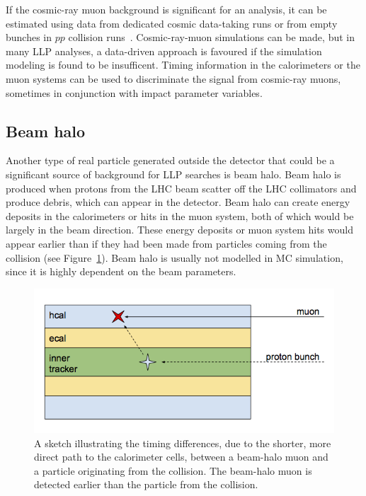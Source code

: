 If the cosmic-ray muon background is significant for an analysis, it can be estimated using data from dedicated cosmic data-taking runs or from empty bunches in $pp$ collision runs~\cite{Khachatryan:2015jha, Chatrchyan:2012dxa, Khachatryan:2010uf}. Cosmic-ray-muon simulations can be made, but in many LLP analyses, a data-driven approach is favoured if the simulation modeling is found to be insufficent. Timing information in the calorimeters or the muon systems can be used to discriminate the signal from  cosmic-ray muons, sometimes in conjunction with impact parameter variables.

\subsection{Beam halo} %

Another type of real particle generated outside the detector that could be a significant source of background for LLP searches is beam halo. Beam halo is produced when protons from the LHC beam scatter off the LHC collimators and produce debris, which can appear in the detector. Beam halo can create energy deposits in the calorimeters or hits in the muon system, both of which would be largely in the beam direction. These energy deposits or muon system hits would appear earlier than if they had been made from particles coming from the collision (see Figure~\ref{fig:beamHaloSketch}). Beam halo is usually not modelled in MC simulation, since it is highly dependent on the beam parameters.

\begin{figure}[h]
  \centering
  \includegraphics[width=\textwidth]{figures/beamHaloSketch.png}
  \caption{A sketch illustrating the timing differences, due to the shorter, more direct path to the calorimeter cells, between a beam-halo muon and a particle originating from the collision. The beam-halo muon is detected earlier than the particle from the collision.}
  \label{fig:beamHaloSketch}
\end{figure}

